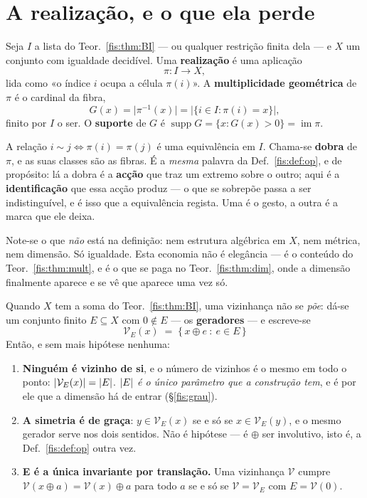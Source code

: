 \documentclass[livro.tex]{subfiles}
\begin{document}
\section{A realização, e o que ela perde}\label{fis:mult}

\begin{definicao}\label{fis:def:objeto}
Seja $I$ a lista do Teor.~\ref{fis:thm:BI} --- ou qualquer restrição finita dela
--- e $X$ um conjunto com igualdade decidível. Uma \textbf{realização} é uma
aplicação
\[
\pi\colon I\longrightarrow X ,
\]
lida como «o índice $i$ ocupa a célula $\pi(i)$». A \textbf{multiplicidade
geométrica} de $\pi$ é o cardinal da fibra,
\[
G(x)=\bigl\lvert\pi^{-1}(x)\bigr\rvert
=\bigl\lvert\{i\in I:\pi(i)=x\}\bigr\rvert ,
\]
finito por $I$ o ser. O \textbf{suporte} de $G$ é
$\operatorname{supp}G=\{x: G(x)>0\}=\operatorname{im}\pi$.

\medskip\noindent A relação $i\sim j \iff \pi(i)=\pi(j)$ é uma equivalência em
$I$. Chama-se \textbf{dobra} de $\pi$, e as suas classes são as fibras. É a
\emph{mesma} palavra da Def.~\ref{fis:def:op}, e de propósito: lá a dobra é a
\textbf{acção} que traz um extremo sobre o outro; aqui é a
\textbf{identificação} que essa acção produz --- o que se sobrepõe passa a ser
indistinguível, e é isso que a equivalência regista. Uma é o gesto, a outra é a
marca que ele deixa.

\medskip\noindent Note-se o que \emph{não} está na definição: nem estrutura
algébrica em $X$, nem métrica, nem dimensão. Só igualdade. Esta economia não é
elegância --- é o conteúdo do Teor.~\ref{fis:thm:mult}, e é o que se paga no
Teor.~\ref{fis:thm:dim}, onde a dimensão finalmente aparece e se vê que aparece
uma vez só.
\end{definicao}

\begin{lema}\label{fis:lem:vizalg}
Quando $X$ tem a soma do Teor.~\ref{fis:thm:BI}, uma vizinhança não se \emph{põe}:
dá-se um conjunto finito $E\subseteq X$ com $0\notin E$ --- os
\textbf{geradores} --- e escreve-se
\[
\boxed{\;\mathcal{V}_E(x)\;=\;\{\,x\oplus e\ :\ e\in E\,\}\;}
\]
Então, e sem mais hipótese nenhuma:
\begin{enumerate}\itemsep3pt
\item[(1)] \textbf{Ninguém é vizinho de si}, e o número de vizinhos é o mesmo em
todo o ponto: $\lvert \mathcal{V}_E(x)\rvert=\lvert E\rvert$. \emph{$\lvert E\rvert$ é o único
parâmetro que a construção tem}, e é por ele que a dimensão há de entrar
(§\ref{fis:grau}).
\item[(2)] \textbf{A simetria é de graça}: $y\in\mathcal{V}_E(x)$ se e só se
$x\in\mathcal{V}_E(y)$, e o mesmo gerador serve nos dois sentidos. Não é hipótese
--- é $\oplus$ ser involutivo, isto é, a Def.~\ref{fis:def:op} outra vez.
\item[(3)] \textbf{E é a única invariante por translação.} Uma vizinhança
$\mathcal{V}$ cumpre $\mathcal{V}(x\oplus a)=\mathcal{V}(x)\oplus a$ para todo
$a$ se e só se $\mathcal{V}=\mathcal{V}_E$ com $E=\mathcal{V}(0)$.
\end{enumerate}
\end{lema}
\end{document}

